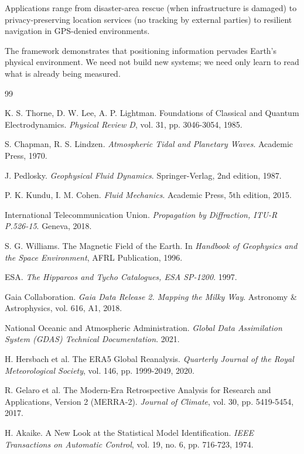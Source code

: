 \documentclass[11pt,twocolumn,a4paper]{article}
\theoremstyle{definition}
\begin{document}
Applications range from disaster-area rescue (when infrastructure is damaged) to privacy-preserving location services (no tracking by external parties) to resilient navigation in GPS-denied environments.

The framework demonstrates that positioning information pervades Earth's physical environment. We need not build new systems; we need only learn to read what is already being measured.

\begin{thebibliography}{99}

 K. S. Thorne, D. W. Lee, A. P. Lightman. Foundations of Classical and Quantum Electrodynamics. \emph{Physical Review D}, vol. 31, pp. 3046-3054, 1985.

 S. Chapman, R. S. Lindzen. \emph{Atmospheric Tidal and Planetary Waves}. Academic Press, 1970.

 J. Pedlosky. \emph{Geophysical Fluid Dynamics}. Springer-Verlag, 2nd edition, 1987.

 P. K. Kundu, I. M. Cohen. \emph{Fluid Mechanics}. Academic Press, 5th edition, 2015.

 International Telecommunication Union. \emph{Propagation by Diffraction, ITU-R P.526-15}. Geneva, 2018.

 S. G. Williams. The Magnetic Field of the Earth. In \emph{Handbook of Geophysics and the Space Environment}, AFRL Publication, 1996.

 ESA. \emph{The Hipparcos and Tycho Catalogues, ESA SP-1200}. 1997.

 Gaia Collaboration. \emph{Gaia Data Release 2. Mapping the Milky Way}. Astronomy \& Astrophysics, vol. 616, A1, 2018.

 National Oceanic and Atmospheric Administration. \emph{Global Data Assimilation System (GDAS) Technical Documentation}. 2021.

 H. Hersbach et al. The ERA5 Global Reanalysis. \emph{Quarterly Journal of the Royal Meteorological Society}, vol. 146, pp. 1999-2049, 2020.

 R. Gelaro et al. The Modern-Era Retrospective Analysis for Research and Applications, Version 2 (MERRA-2). \emph{Journal of Climate}, vol. 30, pp. 5419-5454, 2017.

 H. Akaike. A New Look at the Statistical Model Identification. \emph{IEEE Transactions on Automatic Control}, vol. 19, no. 6, pp. 716-723, 1974.

\end{thebibliography}
\end{document}
